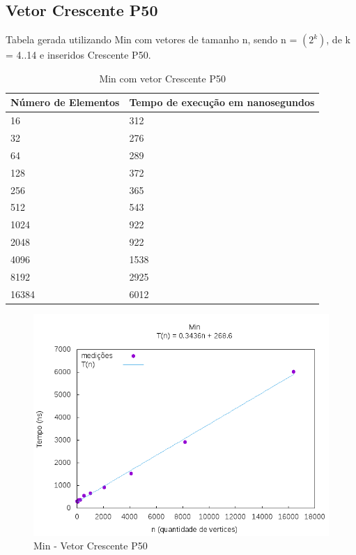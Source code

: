 \documentclass[12pt,a4paper,twoside]{report}
\begin{document}
\subsection{Vetor Crescente P50}
Tabela gerada utilizando Min com vetores de tamanho n, sendo n = $(2^k)$, de k = 4..14 e inseridos Crescente P50.
\begin{table}[H]
\centering
\caption{Min com vetor Crescente P50}
\label{my-label}
\begin{tabular}{|l|l|}
\hline
\multicolumn{1}{|c|}{\textbf{Número de Elementos}} & \multicolumn{1}{c|}{\textbf{Tempo de execução em nanosegundos}} \\ \hline
16 & 312 \\ \hline
32 & 276 \\ \hline
64 & 289 \\ \hline
128 & 372 \\ \hline
256 & 365 \\ \hline
512 & 543 \\ \hline
1024 & 922 \\ \hline
2048 & 922 \\ \hline
4096 & 1538 \\ \hline
8192 & 2925 \\ \hline
16384 & 6012 \\ \hline

\end{tabular}
\end{table}

\begin{figure}[H]
    \centering
    \includegraphics[width=0.7\linewidth]{graficos/Min/Crescente P50/Min.png}
  \caption{Min - Vetor Crescente P50}
\end{figure}
\end{document}
